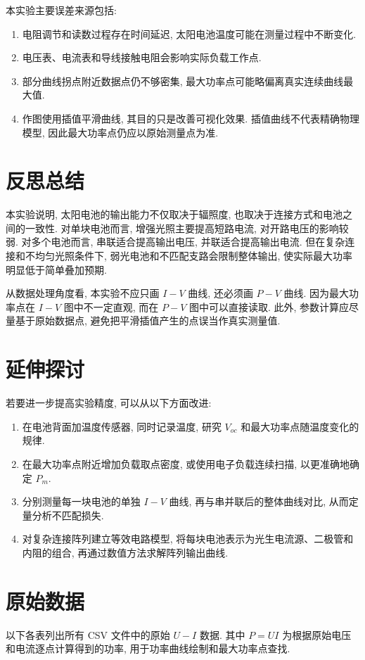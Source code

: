\documentclass[UTF8,a4paper,12pt]{ctexart}
\begin{document}
本实验主要误差来源包括:
\begin{enumerate}
    \item 电阻调节和读数过程存在时间延迟, 太阳电池温度可能在测量过程中不断变化.
    \item 电压表、电流表和导线接触电阻会影响实际负载工作点.
    \item 部分曲线拐点附近数据点仍不够密集, 最大功率点可能略偏离真实连续曲线最大值.
    \item 作图使用插值平滑曲线, 其目的只是改善可视化效果. 插值曲线不代表精确物理模型, 因此最大功率点仍应以原始测量点为准.
\end{enumerate}

\section{反思总结}

本实验说明, 太阳电池的输出能力不仅取决于辐照度, 也取决于连接方式和电池之间的一致性. 对单块电池而言, 增强光照主要提高短路电流, 对开路电压的影响较弱. 对多个电池而言, 串联适合提高输出电压, 并联适合提高输出电流. 但在复杂连接和不均匀光照条件下, 弱光电池和不匹配支路会限制整体输出, 使实际最大功率明显低于简单叠加预期.

从数据处理角度看, 本实验不应只画 $I-V$ 曲线, 还必须画 $P-V$ 曲线. 因为最大功率点在 $I-V$ 图中不一定直观, 而在 $P-V$ 图中可以直接读取. 此外, 参数计算应尽量基于原始数据点, 避免把平滑插值产生的点误当作真实测量值.

\section{延伸探讨}

若要进一步提高实验精度, 可以从以下方面改进:
\begin{enumerate}
    \item 在电池背面加温度传感器, 同时记录温度, 研究 $V_{oc}$ 和最大功率点随温度变化的规律.
    \item 在最大功率点附近增加负载取点密度, 或使用电子负载连续扫描, 以更准确地确定 $P_m$.
    \item 分别测量每一块电池的单独 $I-V$ 曲线, 再与串并联后的整体曲线对比, 从而定量分析不匹配损失.
    \item 对复杂连接阵列建立等效电路模型, 将每块电池表示为光生电流源、二极管和内阻的组合, 再通过数值方法求解阵列输出曲线.
\end{enumerate}

\appendix
\section{原始数据}
\label{sec:raw-data}

以下各表列出所有 CSV 文件中的原始 $U-I$ 数据. 其中 $P=UI$ 为根据原始电压和电流逐点计算得到的功率, 用于功率曲线绘制和最大功率点查找.


\end{document}
